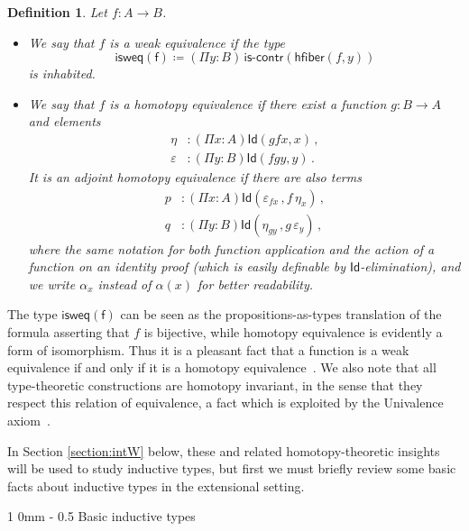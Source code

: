 \documentclass[reqno,10pt,a4paper,oneside]{amsart}
\makeatletter
\newcommand{\defeq}{\coloneqq}
\newcommand{\Id}{\mathsf{Id}}
\newcommand{\iscontr}{\mathsf{is}\text{-}\mathsf{contr}}
\newcommand{\hfiber}{\mathsf{hfiber}}
\renewcommand{\section}{\@startsection
  {section}%
   {1}%
  {0mm}%
   {-\baselineskip}%
  {0.5\baselineskip}%
   {\Large\bfseries}}%
\numberwithin{equation}{section}
\theoremstyle{mythm}
\theoremstyle{mydef}
\newtheorem{definition}[theorem]{Definition}
\theoremstyle{myrmk}
\makeatother
\begin{document}
\begin{definition} \label{thm:weq} Let $f : A \rightarrow B$.
\begin{itemize}
%
\item We say that $f$ is a \emph{weak equivalence} if  the type
\[
\mathsf{isweq(f)} \defeq (\Pi y : B) \,  \iscontr(\hfiber(f,y)) 
\]
is inhabited. 
%
\item We say that $f$ is a \emph{homotopy equivalence} if there exist a function 
$g : B\rightarrow A$ and elements
\begin{align*}
\eta &: (\Pi x : A) \Id( g  f  x , x) \,  ,\\
\varepsilon &: (\Pi y:B) \Id( f   g  y, y) \, .
\end{align*}
It is an \emph{adjoint homotopy equivalence} if there are also
terms
\begin{align*}
p &: (\Pi x : A) \Id ( \varepsilon_{f x} \, , f \, \eta_x )  \, , \\
q &: (\Pi y : B) \Id ( \eta_{g y} \, , g \, \varepsilon_y) \, ,
\end{align*}
where the same notation for both function application and
the action of a function on an identity proof (which is easily definable by $\Id$-elimination),
and we write $\alpha_x$ instead of $\alpha(x)$ for better readability.
%
\end{itemize}
\end{definition}

The type $\mathsf{isweq(f)}$ can be seen as the propositions-as-types translation of the formula asserting that $f$ is bijective, while homotopy equivalence is evidently a form of isomorphism. Thus it is a pleasant fact that a function is a weak equivalence if and only if it is a homotopy equivalence~\cite{VoevodskyV:unifc}. 
We also note that all type-theoretic constructions are homotopy invariant, in the sense that they respect this relation of equivalence, a fact which is exploited by the Univalence axiom~\cite{VoevodskyV:notts}.


\medskip

In Section \ref{section:intW} below, these and related homotopy-theoretic insights will be used to study inductive types, but first we must briefly review some basic facts about  inductive types in the extensional setting.

\newpage

\section{Basic inductive types}
\label{section:simple}
\end{document}
